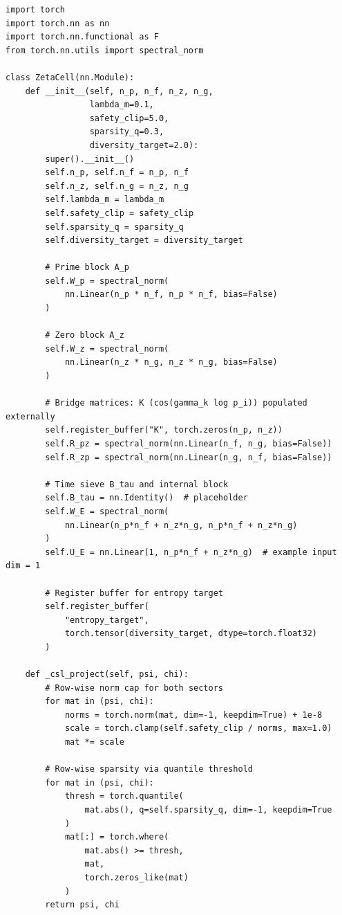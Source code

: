 \documentclass[11pt]{article}
\theoremstyle{definition}
\theoremstyle{plain}
\begin{document}
\begin{verbatim}
import torch
import torch.nn as nn
import torch.nn.functional as F
from torch.nn.utils import spectral_norm

class ZetaCell(nn.Module):
    def __init__(self, n_p, n_f, n_z, n_g,
                 lambda_m=0.1,
                 safety_clip=5.0,
                 sparsity_q=0.3,
                 diversity_target=2.0):
        super().__init__()
        self.n_p, self.n_f = n_p, n_f
        self.n_z, self.n_g = n_z, n_g
        self.lambda_m = lambda_m
        self.safety_clip = safety_clip
        self.sparsity_q = sparsity_q
        self.diversity_target = diversity_target

        # Prime block A_p
        self.W_p = spectral_norm(
            nn.Linear(n_p * n_f, n_p * n_f, bias=False)
        )

        # Zero block A_z
        self.W_z = spectral_norm(
            nn.Linear(n_z * n_g, n_z * n_g, bias=False)
        )

        # Bridge matrices: K (cos(gamma_k log p_i)) populated externally
        self.register_buffer("K", torch.zeros(n_p, n_z))
        self.R_pz = spectral_norm(nn.Linear(n_f, n_g, bias=False))
        self.R_zp = spectral_norm(nn.Linear(n_g, n_f, bias=False))

        # Time sieve B_tau and internal block
        self.B_tau = nn.Identity()  # placeholder
        self.W_E = spectral_norm(
            nn.Linear(n_p*n_f + n_z*n_g, n_p*n_f + n_z*n_g)
        )
        self.U_E = nn.Linear(1, n_p*n_f + n_z*n_g)  # example input dim = 1

        # Register buffer for entropy target
        self.register_buffer(
            "entropy_target",
            torch.tensor(diversity_target, dtype=torch.float32)
        )

    def _csl_project(self, psi, chi):
        # Row-wise norm cap for both sectors
        for mat in (psi, chi):
            norms = torch.norm(mat, dim=-1, keepdim=True) + 1e-8
            scale = torch.clamp(self.safety_clip / norms, max=1.0)
            mat *= scale

        # Row-wise sparsity via quantile threshold
        for mat in (psi, chi):
            thresh = torch.quantile(
                mat.abs(), q=self.sparsity_q, dim=-1, keepdim=True
            )
            mat[:] = torch.where(
                mat.abs() >= thresh,
                mat,
                torch.zeros_like(mat)
            )
        return psi, chi


\end{verbatim}
\end{document}
